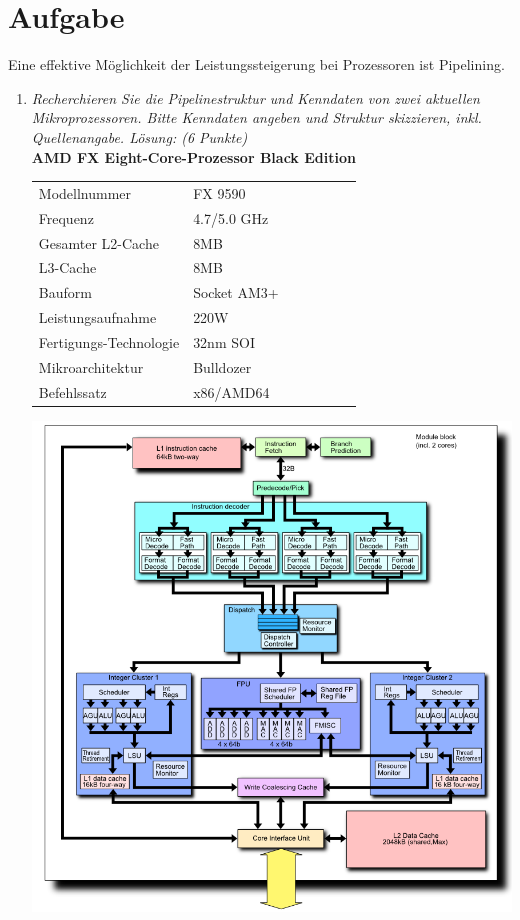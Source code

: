 \documentclass[10pt]{article}
\begin{document}
\newpage

\section{Aufgabe}
Eine effektive Möglichkeit der Leistungssteigerung bei Prozessoren ist Pipelining.
\begin{enumerate}[label=\alph*)]
	\item 
	\textit{Recherchieren Sie die Pipelinestruktur und Kenndaten von zwei aktuellen Mikroprozessoren. Bitte Kenndaten angeben und Struktur skizzieren, inkl. Quellenangabe. Lösung: (6 Punkte) } \\
	\textbf{AMD FX Eight-Core-Prozessor Black Edition}\\
	\begin{tabular}{ l l l l l l l }
		Modellnummer & FX 9590\\
		Frequenz & 4.7/5.0 GHz\\
		Gesamter L2-Cache & 8MB\\
		L3-Cache & 8MB\\
		Bauform & Socket AM3+\\
		Leistungsaufnahme & 220W\\
		Fertigungs-Technologie & 32nm SOI\\
		Mikroarchitektur & Bulldozer \\
		Befehlssatz & x86/AMD64 \\
	\end{tabular}
	
	\includegraphics[width=1\textwidth]{images/AMD_Bulldozer.png}
	

\end{enumerate}
\end{document}
